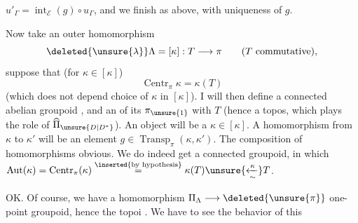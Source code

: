 \(u'_{\Gamma}=\operatorname{int}_{\mathcal E}(g)\circ u_{\Gamma}\), and we finish as
above, with uniqueness of \(g\).

Now take an  outer homomorphism
\[
\deleted{\unsure{\lambda}}\Lambda=[\kappa]:T\longrightarrow\pi
\qquad (T\text{ commutative}),
\]
suppose that (for \(\kappa\in[\kappa]\))
\[
\operatorname{Centr}_\pi\kappa=\kappa(T)
\]
(which does not depend  choice of \(\kappa\) in
\([\kappa]\)). I will then define a
 connected abelian groupoid \inserted{\(\Pi_\Lambda\)}, and an
 of its \(\pi_{\unsure{1}}\) with \(T\) 
(hence a topos, which plays the role of
\(\widehat{\Pi}_{\unsure{D|D^*}}\)). An object will be a \(\kappa\in[\kappa]\).
A homomorphism from \(\kappa\) to \(\kappa'\) will be an
element \(g\in\operatorname{Transp}_\pi(\kappa,\kappa')\). 
The composition of homomorphisms obvious. We
do indeed get a connected groupoid, in
which \(\operatorname{Aut}(\kappa)=\operatorname{Centr}_\pi(\kappa)\overset{\inserted{\text{by hypothesis}}}{=}\kappa(T)\unsure{\xleftarrow[\sim]{\kappa}}T\).

OK. Of course, we have a homomorphism
\(\Pi_\Lambda\longrightarrow\deleted{\unsure{\pi}}\) one-point groupoid, hence
 the  topoi  .
We have to see the behavior of this

